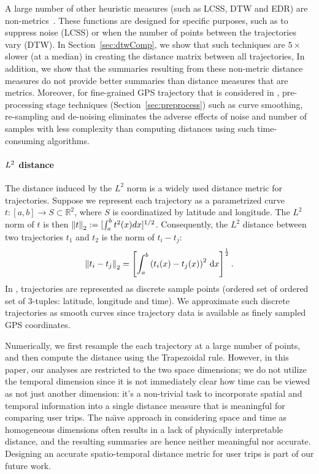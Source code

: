 A large number of other heuristic measures (such as LCSS, DTW and EDR) are non-metrics~\cite{Vlachos2002,Yi1998,Chen2005}. These functions are designed for specific purposes, such as to suppress noise (LCSS) or when the number of points between the trajectories vary (DTW). In Section~\ref{sec:dtwComp}, we show that such techniques are $5\times$ slower (at a median) in creating the distance matrix between all trajectories, In addition, we show that the summaries resulting from these non-metric distance measures do not provide better summaries than distance measures that are metrics. 
Moreover, for fine-grained GPS trajectory that is considered in \trajSummary, pre-processing stage techniques (Section~\ref{sec:preprocess}) such as curve smoothing, re-sampling and de-noising eliminates the adverse effects of noise and number of samples with less complexity than computing distances using such time-consuming algorithms. 

\paragraph{$L^2$ distance}
The distance induced by the $L^2$ norm is a widely used distance metric for trajectories. Suppose we represent each trajectory as a parametrized curve $t:[a,b]\rightarrow S \subset \mathbb{R}^2$, where $S$ is coordinatized by latitude and longitude. The $L^2$ norm of $t$ is then $\left\lVert t\right\rVert_2:=[\int _a^b t^2(x)dx]^{1/2}$. Consequently, the $L^2$ distance between two trajectories $t_1$ and $t_2$ is the norm of $t_i-t_j$:
\begin{align}
\left\lVert t_i-t_j\right\rVert_2 = \left[ \int_{a}^{b}{\left(t_i(x) - t_j(x) \right )^2\, \mathrm{d}x }\right] ^ {\frac{1}{2}}.
\end{align}
In \trajSummary, trajectories are represented as discrete sample points (ordered set of ordered set of 3-tuples: latitude, longitude and time). We approximate such discrete trajectories as smooth curves since trajectory data is available as finely sampled GPS coordinates. 

Numerically, we first resample the each trajectory at a large number of points, and then compute the distance using the Trapezoidal rule. However, in this paper, our analyses are restricted to the two space dimensions; we do not utilize the temporal dimension since it is not immediately clear how time can be viewed as not just another dimension: it's a non-trivial task to incorporate spatial and temporal information into a single distance measure that is meaningful for comparing user trips. The na\"{\i}ve approach in considering space and time as homogeneous dimensions often results in a lack of physically interpretable distance, and the resulting summaries are hence neither meaningful nor accurate. Designing an accurate spatio-temporal distance metric for user trips is part of our future work.


